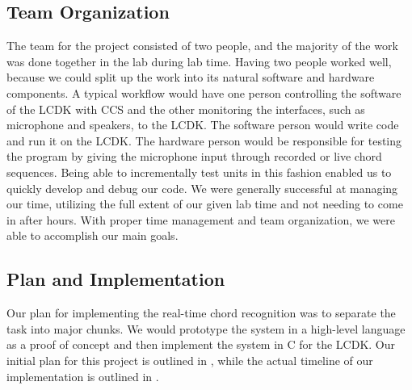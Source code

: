 \documentclass[journal]{IEEEtran}
\begin{document}
\subsection{Team Organization}
The team for the project consisted of two people, and the majority of the work was done together in the lab during lab time.
Having two people worked well, because we could split up the work into its natural software and hardware components.
A typical workflow would have one person controlling the software of the LCDK with CCS and the other monitoring the interfaces, such as microphone and speakers, to the LCDK.
The software person would write code and run it on the LCDK.
The hardware person would be responsible for testing the program by giving the microphone input through recorded or live chord sequences.
Being able to incrementally test units in this fashion enabled us to quickly develop and debug our code.
We were generally successful at managing our time, utilizing the full extent of our given lab time and not needing to come in after hours.
With proper time management and team organization, we were able to accomplish our main goals.


\subsection{Plan and Implementation}
Our plan for implementing the real-time chord recognition was to separate the task into major chunks.
We would prototype the system in a high-level language as a proof of concept and then implement the system in C for the LCDK.
Our initial plan for this project is outlined in , while the actual timeline of our implementation is outlined in .
\end{document}
